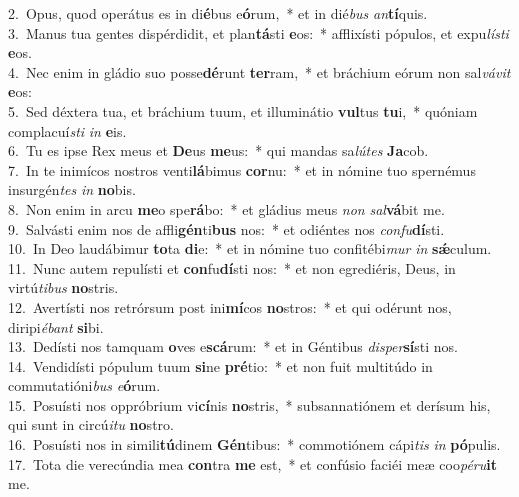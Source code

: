 {2.~}Opus, quod operátus es in di\textbf{é}bus e\textbf{ó}rum,~* et in dié\textit{bus} \textit{an}\textbf{tí}quis.\\
{3.~}Manus tua gentes dispérdidit, et plan\textbf{tá}sti \textbf{e}os:~* afflixísti pópulos, et expu\textit{lí}\textit{sti} \textbf{e}os.\\
{4.~}Nec enim in gládio suo posse\textbf{dé}runt \textbf{ter}ram,~* et bráchium eórum non sal\textit{vá}\textit{vit} \textbf{e}os:\\
{5.~}Sed déxtera tua, et bráchium tuum, et illuminátio \textbf{vul}tus \textbf{tu}i,~* quóniam complacuí\textit{sti} \textit{in} \textbf{e}is.\\
{6.~}Tu es ipse Rex meus et \textbf{De}us \textbf{me}us:~* qui mandas sa\textit{lú}\textit{tes} \textbf{Ja}cob.\\
{7.~}In te inimícos nostros venti\textbf{lá}bimus \textbf{cor}nu:~* et in nómine tuo spernémus insurgén\textit{tes} \textit{in} \textbf{no}bis.\\
{8.~}Non enim in arcu \textbf{me}o spe\textbf{rá}bo:~* et gládius meus \textit{non} \textit{sal}\textbf{vá}bit me.\\
{9.~}Salvásti enim nos de affli\textbf{gén}ti\textbf{bus} nos:~* et odiéntes nos \textit{con}\textit{fu}\textbf{dí}sti.\\
{10.~}In Deo laudábimur \textbf{to}ta \textbf{di}e:~* et in nómine tuo confitébi\textit{mur} \textit{in} \textbf{sǽ}culum.\\
{11.~}Nunc autem repulísti et \textbf{con}fu\textbf{dí}sti nos:~* et non egrediéris, Deus, in virtú\textit{ti}\textit{bus} \textbf{no}stris.\\
{12.~}Avertísti nos retrórsum post ini\textbf{mí}cos \textbf{no}stros:~* et qui odérunt nos, diripi\textit{é}\textit{bant} \textbf{si}bi.\\
{13.~}Dedísti nos tamquam \textbf{o}ves e\textbf{scá}rum:~* et in Géntibus \textit{di}\textit{sper}\textbf{sí}sti nos.\\
{14.~}Vendidísti pópulum tuum \textbf{si}ne \textbf{pré}tio:~* et non fuit multitúdo in commutatióni\textit{bus} \textit{e}\textbf{ó}rum.\\
{15.~}Posuísti nos oppróbrium vi\textbf{cí}nis \textbf{no}stris,~* subsannatiónem et derísum his, qui sunt in circú\textit{i}\textit{tu} \textbf{no}stro.\\
{16.~}Posuísti nos in simili\textbf{tú}dinem \textbf{Gén}tibus:~* commotiónem cápi\textit{tis} \textit{in} \textbf{pó}pulis.\\
{17.~}Tota die verecúndia mea \textbf{con}tra \textbf{me} est,~* et confúsio faciéi meæ coo\textit{pé}\textit{ru}\textbf{it} me.\\
